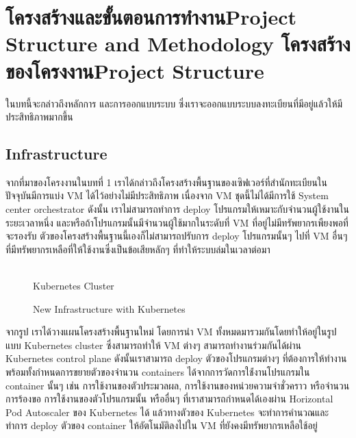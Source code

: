 \chapter{\ifproject%
\ifcpe โครงสร้างและขั้นตอนการทำงาน\else Project Structure and Methodology\fi
\else%
\ifcpe โครงสร้างของโครงงาน\else Project Structure\fi
\fi
}

ในบทนี้จะกล่าวถึงหลักการ และการออกแบบระบบ ซึ่งเราจะออกแบบระบบลงทะเบียนที่มีอยู่แล้วให้มีประสิทธิภาพมากขึ้น

\makeatletter

\section {Infrastructure}

จากที่มาของโครงงานในบทที่ 1 เราได้กล่าวถึงโครงสร้างพื้นฐานของเซิฟเวอร์ที่สำนักทะเบียนในปัจจุบันมีการแบ่ง VM \cite{vm} ได้ไว้อย่างไม่มีประสิทธิภาพ เนื่องจาก VM ชุดนี้ไม่ได้มีการใช้ System center orchestrator \cite{sco} ดังนั้น เราไม่สามารถทำการ deploy โปรแกรมให้เหมาะกับจำนวนผู้ใช้งานในระยะเวลาหนึ่ง และหรือถ้าโปรแกรมนั้นมีจำนวนผู้ใช้มากในระดับที่ VM ที่อยู่ไม่มีทรัพยากรเพืยงพอที่จะรองรับ ตัวของโครงสร้างพื้นฐานนี้เองก็ไม่สามารถปรับการ deploy โปรแกรมนั้นๆ ไปที่ VM อื่นๆ ที่มีทรัพยากรเหลือที่ให้ใช้งานซึ่งเป็นข้อเสียหลักๆ ที่ทำให้ระบบล่มในเวลาต่อมา

\begin{figure}[h]
    \centering
    \begin{center}
     \\
    Kubernetes Cluster
    \end{center}
    \caption[Poem]{New Infrastructure with Kubernetes}
    \label{fig:my_label}
\end{figure}

จากรูป เราได้วางแผนโครงสร้างพื้นฐานใหม่ โดยการนำ VM ทั้งหมดมารวมกันโดยทำให้อยู่ในรูปแบบ Kubernetes cluster ซึ่งสามารถทำให้ VM ต่างๆ สามารถทำงานร่วมกันได้ผ่าน Kubernetes control plane \cite{kubecomp} ดังนั้นเราสามารถ deploy ตัวของโปรแกรมต่างๆ ที่ต้องการให้ทำงานพร้อมทั้งกำหนดการขยายตัวของจำนวน containers ได้จากการวัดการใช้่งานโปรแกรมใน container นั้นๆ เช่น การใช้งานของตัวประมวลผล, การใช้งานของหน่วยความจำชั่วคราว หรือจำนวนการร้องขอ การใช้งานของตัวโปรแกรมนั้น หรืออื่นๆ ที่เราสามารถกำหนดได้เองผ่าน Horizontal Pod Autoscaler \cite{kubehpa} ของ Kubernetes ได้ แล้วทางตัวของ Kubernetes จะทำการคำนวณและทำการ deploy ตัวของ container ให้อัตโนมัติลงไปใน VM ที่ยังคงมีทรัพยากรเหลือใช้อยู่

